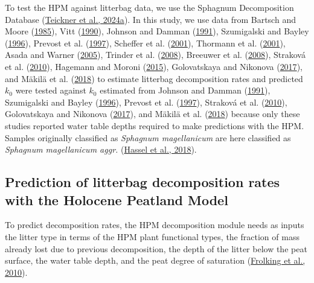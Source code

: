 \documentclass[
  12pt,
]{article}
\begin{document}
To test the HPM against litterbag data, we use the Sphagnum Decomposition Database (\protect\hyperlink{ref-Teickner.2024}{Teickner et al., 2024a}). In this study, we use data from Bartsch and Moore (\protect\hyperlink{ref-Bartsch.1985}{1985}), Vitt (\protect\hyperlink{ref-Vitt.1990}{1990}), Johnson and Damman (\protect\hyperlink{ref-Johnson.1991}{1991}), Szumigalski and Bayley (\protect\hyperlink{ref-Szumigalski.1996}{1996}), Prevost et al. (\protect\hyperlink{ref-Prevost.1997}{1997}), Scheffer et al. (\protect\hyperlink{ref-Scheffer.2001}{2001}), Thormann et al. (\protect\hyperlink{ref-Thormann.2001}{2001}), Asada and Warner (\protect\hyperlink{ref-Asada.2005b}{2005}), Trinder et al. (\protect\hyperlink{ref-Trinder.2008}{2008}), Breeuwer et al. (\protect\hyperlink{ref-Breeuwer.2008}{2008}), Straková et al. (\protect\hyperlink{ref-Strakova.2010}{2010}), Hagemann and Moroni (\protect\hyperlink{ref-Hagemann.2015}{2015}), Golovatskaya and Nikonova (\protect\hyperlink{ref-Golovatskaya.2017}{2017}), and Mäkilä et al. (\protect\hyperlink{ref-Makila.2018}{2018}) to estimate litterbag decomposition rates and predicted \(k_0\) were tested against \(k_0\) estimated from Johnson and Damman (\protect\hyperlink{ref-Johnson.1991}{1991}), Szumigalski and Bayley (\protect\hyperlink{ref-Szumigalski.1996}{1996}), Prevost et al. (\protect\hyperlink{ref-Prevost.1997}{1997}), Straková et al. (\protect\hyperlink{ref-Strakova.2010}{2010}), Golovatskaya and Nikonova (\protect\hyperlink{ref-Golovatskaya.2017}{2017}), and Mäkilä et al. (\protect\hyperlink{ref-Makila.2018}{2018}) because only these studies reported water table depths required to make predictions with the HPM. Samples originally classified as \emph{Sphagnum magellanicum} are here classified as \emph{Sphagnum magellanicum aggr.} (\protect\hyperlink{ref-Hassel.2018}{Hassel et al., 2018}).

\hypertarget{sdm-003-methods-2}{%
\subsection{Prediction of litterbag decomposition rates with the Holocene Peatland Model}\label{sdm-003-methods-2}}

To predict decomposition rates, the HPM decomposition module needs as inputs the litter type in terms of the HPM plant functional types, the fraction of mass already lost due to previous decomposition, the depth of the litter below the peat surface, the water table depth, and the peat degree of saturation (\protect\hyperlink{ref-Frolking.2010}{Frolking et al., 2010}).
\end{document}
